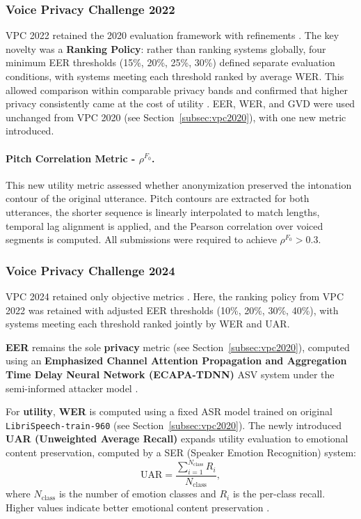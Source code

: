 \documentclass[12pt,leqno,a4paper]{article}
\begin{document}
\subsubsection{Voice Privacy Challenge 2022}
VPC 2022 retained the 2020 evaluation framework with refinements 
\citep{tomashenko2022voiceprivacy2022challengeevaluation, 
tomashenko_voiceprivacy_2022, panariello_voiceprivacy_2024}. The key 
novelty was a \textbf{Ranking Policy}: rather than ranking systems 
globally, four minimum EER thresholds (15\%, 20\%, 25\%, 30\%) defined 
separate evaluation conditions, with systems meeting each threshold ranked 
by average WER. This allowed comparison within comparable privacy bands 
and confirmed that higher privacy consistently came at the cost of utility 
\citep{panariello_voiceprivacy_2024}. EER, WER, and GVD were used 
unchanged from VPC 2020 (see Section~\ref{subsec:vpc2020}), with one 
new metric introduced.

\paragraph{Pitch Correlation Metric - $\rho^{F_0}$.}
This new utility metric assessed whether anonymization preserved 
the intonation contour of the original utterance. Pitch contours are 
extracted for both utterances, the shorter sequence is linearly 
interpolated to match lengths, temporal lag alignment is applied, and 
the Pearson correlation over voiced segments is computed. All submissions 
were required to achieve $\rho^{F_0} > 0.3$.

\subsubsection{Voice Privacy Challenge 2024}
VPC 2024 retained only objective metrics \citep{tomashenko2024voiceprivacy2024challengeevaluation}. 
Here, the ranking policy from VPC 2022 was retained with adjusted EER thresholds (10\%, 20\%, 30\%, 40\%), 
with systems meeting each threshold ranked jointly by WER and UAR.

\textbf{EER} remains the sole \textbf{privacy} metric (see 
Section~\ref{subsec:vpc2020}), computed using an \textbf{Emphasized Channel Attention Propagation and Aggregation Time Delay Neural Network (ECAPA-TDNN)} ASV system 
under the semi-informed attacker model \citep{tomashenko2024voiceprivacy2024challengeevaluation}.

For \textbf{utility}, \textbf{WER} is computed using a fixed ASR model 
trained on original \texttt{LibriSpeech-train-960} (see Section~\ref{subsec:vpc2020}). 
The newly introduced \textbf{UAR (Unweighted Average Recall)} expands 
utility evaluation to emotional content preservation, computed by a SER (Speaker Emotion Recognition)
system:
\begin{equation}
\mathrm{UAR} = \frac{\sum_{i=1}^{N_{\mathrm{class}}} R_i}{N_{\mathrm{class}}},
\end{equation}
where $N_{\mathrm{class}}$ is the number of emotion classes and $R_i$ 
is the per-class recall. Higher values indicate
better emotional content preservation 
\citep{tomashenko2024voiceprivacy2024challengeevaluation}.
\end{document}
